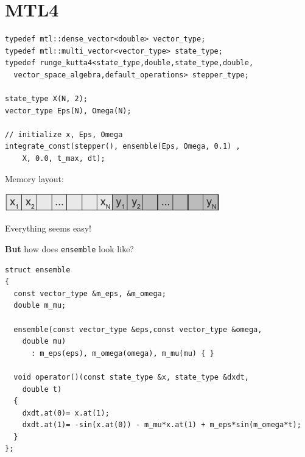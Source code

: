 
\section{MTL4}

\begin{frame}[fragile]


 \begin{lstlisting}[basicstyle=\scriptsize\ttfamily]
typedef mtl::dense_vector<double> vector_type;
typedef mtl::multi_vector<vector_type> state_type;
typedef runge_kutta4<state_type,double,state_type,double,
  vector_space_algebra,default_operations> stepper_type;

state_type X(N, 2);
vector_type Eps(N), Omega(N);

// initialize x, Eps, Omega
integrate_const(stepper(), ensemble(Eps, Omega, 0.1) ,
    X, 0.0, t_max, dt);
 \end{lstlisting}

\vspace{2ex}

\centerline{Memory layout:}

\vspace{1ex}

\centerline{\includegraphics[draft=false,width=0.7\textwidth]{memory_layout2.pdf}}

\vspace{2ex}

\centerline{Everything seems easy!}
\vspace{2ex}
\centerline{{\bf But} how does {\tt ensemble} look like?}
 

\end{frame}




\begin{frame}[fragile]


 \begin{lstlisting}[basicstyle=\scriptsize\ttfamily]
struct ensemble
{
  const vector_type &m_eps, &m_omega;
  double m_mu;

  ensemble(const vector_type &eps,const vector_type &omega,
    double mu)
      : m_eps(eps), m_omega(omega), m_mu(mu) { }

  void operator()(const state_type &x, state_type &dxdt,
    double t)
  {
    dxdt.at(0)= x.at(1);
    dxdt.at(1)= -sin(x.at(0)) - m_mu*x.at(1) + m_eps*sin(m_omega*t);
  }
};
 \end{lstlisting}

\end{frame}

